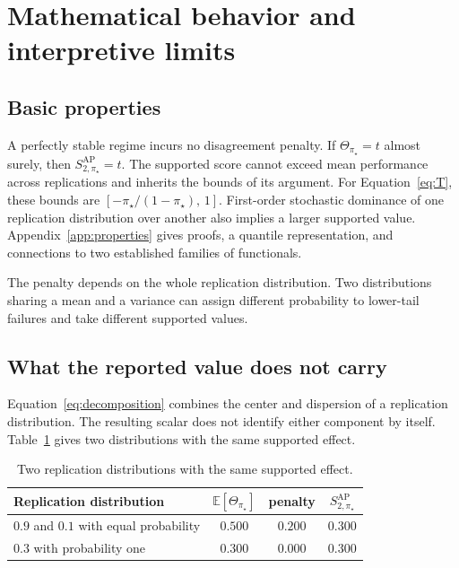 \documentclass[11pt]{article}
\newcommand{\E}{\mathbb{E}}
\newcommand{\SAP}{S_{2,\pi_\star}^{\mathrm{AP}}}
\theoremstyle{remark}
\begin{document}
\section{Mathematical behavior and interpretive limits}
\label{sec:properties}

\subsection{Basic properties}

A perfectly stable regime incurs no disagreement penalty. If $\Theta_{\pi_\star}=t$ almost surely, then $\SAP=t$. The supported score cannot exceed mean performance across replications and inherits the bounds of its argument. For Equation~\eqref{eq:T}, these bounds are $[-\pi_\star/(1-\pi_\star),\,1]$. First-order stochastic dominance of one replication distribution over another also implies a larger supported value. Appendix~\ref{app:properties} gives proofs, a quantile representation, and connections to two established families of functionals.

The penalty depends on the whole replication distribution. Two distributions sharing a mean and a variance can assign different probability to lower-tail failures and take different supported values.

\subsection{What the reported value does not carry}
\label{sec:collision}

Equation~\eqref{eq:decomposition} combines the center and dispersion of a replication distribution. The resulting scalar does not identify either component by itself. Table~\ref{tab:collision} gives two distributions with the same supported effect.

\begin{table}[ht]
\centering
\caption{Two replication distributions with the same supported effect.}
\label{tab:collision}
\begin{tabular}{@{}lccc@{}}
\toprule
Replication distribution & $\E[\Theta_{\pi_\star}]$ & penalty & $\SAP$ \\
\midrule
$0.9$ and $0.1$ with equal probability & $0.500$ & $0.200$ & $0.300$ \\
$0.3$ with probability one & $0.300$ & $0.000$ & $0.300$ \\
\bottomrule
\end{tabular}
\end{table}
\end{document}
